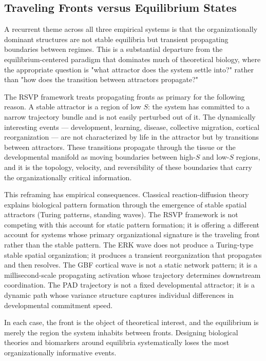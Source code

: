 \documentclass[11pt,a4paper]{article}
\theoremstyle{plain}
\theoremstyle{definition}
\begin{document}
\subsection{Traveling Fronts versus Equilibrium States}

A recurrent theme across all three empirical systems is that the organizationally
dominant structures are not stable equilibria but transient propagating boundaries
between regimes. This is a substantial departure from the equilibrium-centered
paradigm that dominates much of theoretical biology, where the appropriate question
is "what attractor does the system settle into?" rather than "how does the transition
between attractors propagate?"

The RSVP framework treats propagating fronts as primary for the following reason.
A stable attractor is a region of low $S$: the system has committed to a narrow
trajectory bundle and is not easily perturbed out of it. The dynamically interesting
events --- development, learning, disease, collective migration, cortical reorganization
--- are not characterized by life in the attractor but by transitions between
attractors. These transitions propagate through the tissue or the developmental
manifold as moving boundaries between high-$S$ and low-$S$ regions, and it is the
topology, velocity, and reversibility of these boundaries that carry the organizationally
critical information.

This reframing has empirical consequences. Classical reaction-diffusion theory explains
biological pattern formation through the emergence of stable spatial attractors (Turing
patterns, standing waves). The RSVP framework is not competing with this account for
static pattern formation; it is offering a different account for systems whose primary
organizational signature is the traveling front rather than the stable pattern. The ERK
wave does not produce a Turing-type stable spatial organization; it produces a transient
reorganization that propagates and then resolves. The GBF cortical wave is not a static
network pattern; it is a millisecond-scale propagating activation whose trajectory
determines downstream coordination. The PAD trajectory is not a fixed developmental
attractor; it is a dynamic path whose variance structure captures individual differences
in developmental commitment speed.

In each case, the front is the object of theoretical interest, and the equilibrium
is merely the region the system inhabits between fronts. Designing biological theories
and biomarkers around equilibria systematically loses the most organizationally
informative events.
\end{document}
